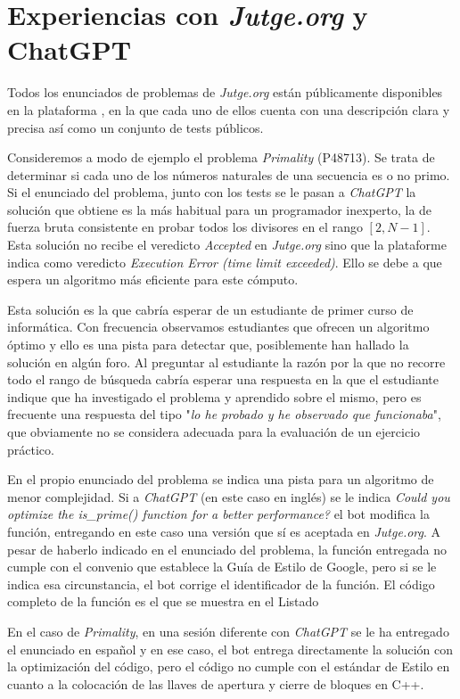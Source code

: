 \documentclass[twocolumn,twoside,a4paper, 10pt]{article}
\newcommand{\jutge}{\textit{Jutge.org}{}}           %
\newcommand{\ChatGPT}{\textit{ChatGPT}{}}           %
\begin{document}
\section{Experiencias con \textit{Jutge.org} y ChatGPT}
Todos los enunciados de problemas de \jutge{} están públicamente disponibles en la
plataforma \cite{URL::prob}, en la que cada uno de ellos cuenta con una descripción clara y precisa así como un
conjunto de tests públicos.

Consideremos a modo de ejemplo el problema \textit{Primality} (P48713).
Se trata de determinar si cada uno de los números naturales de una secuencia es o no primo.
Si el enunciado del problema, junto con los tests se le pasan a \ChatGPT{} la solución que obtiene es la más
habitual para un programador inexperto, la de fuerza bruta consistente en probar todos los divisores en el
rango $[2, N-1]$.
Esta solución no recibe el veredicto \textit{Accepted} en \jutge{} sino que la plataforme indica
como veredicto \textit{Execution Error (time limit exceeded)}.
Ello se debe a que espera un algoritmo más eficiente para este cómputo.

Esta solución es la que cabría esperar de un estudiante de primer curso de informática.
Con frecuencia observamos estudiantes que ofrecen un algoritmo óptimo y ello es una pista para detectar que,
posiblemente han hallado la solución en algún foro. 
Al preguntar al estudiante la razón por la que no recorre todo el rango de búsqueda cabría esperar una
respuesta en la que el estudiante indique que ha investigado el problema y aprendido sobre el mismo, pero es
frecuente una respuesta del tipo "\textit{lo he probado y he observado que funcionaba}", que obviamente no se
considera adecuada para la evaluación de un ejercicio práctico.

En el propio enunciado del problema se indica una pista para un algoritmo de menor complejidad.
Si a \ChatGPT{} (en este caso en inglés) se le indica
\textit{Could you optimize the is\_prime() function for a better performance?}
el bot modifica la función, entregando en este caso una versión que sí es aceptada en \textit{Jutge.org}.
A pesar de haberlo indicado en el enunciado del problema, la función entregada no cumple con el convenio que
establece la Guía de Estilo de Google, pero si se le indica esa circunstancia, el bot corrige el identificador
de la función. 
El código completo de la función es el que se muestra en el Listado

En el caso de \textit{Primality}, en una sesión diferente con \ChatGPT{} se le ha entregado el enunciado en español y
en ese caso, el bot entrega directamente la solución con la optimización del código, pero el código no cumple
con el estándar de Estilo en cuanto a la colocación de las llaves de apertura y cierre de bloques en C++.
\end{document}
